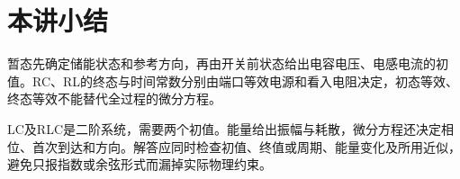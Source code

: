 \section{本讲小结}

暂态先确定储能状态和参考方向，再由开关前状态给出电容电压、电感电流的初值。RC、RL的终态与时间常数分别由端口等效电源和看入电阻决定，初态等效、终态等效不能替代全过程的微分方程。

LC及RLC是二阶系统，需要两个初值。能量给出振幅与耗散，微分方程还决定相位、首次到达和方向。解答应同时检查初值、终值或周期、能量变化及所用近似，避免只报指数或余弦形式而漏掉实际物理约束。

